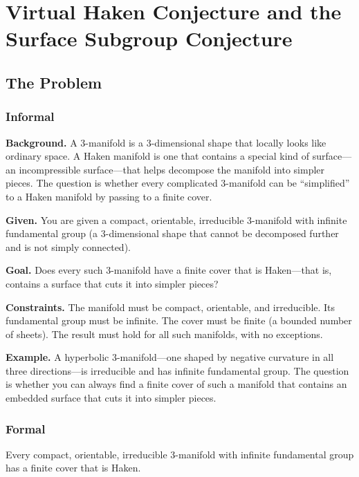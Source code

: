 \let\LocalMacro\relax

\chapter{Virtual Haken Conjecture and the Surface Subgroup Conjecture}

\section{The Problem}

\subsection{Informal}

\textbf{Background.} A 3-manifold is a 3-dimensional shape that locally looks like ordinary space. A Haken manifold is one that contains a special kind of surface---an incompressible surface---that helps decompose the manifold into simpler pieces. The question is whether every complicated 3-manifold can be ``simplified'' to a Haken manifold by passing to a finite cover.

\textbf{Given.} You are given a compact, orientable, irreducible 3-manifold with infinite fundamental group (a 3-dimensional shape that cannot be decomposed further and is not simply connected).

\textbf{Goal.} Does every such 3-manifold have a finite cover that is Haken---that is, contains a surface that cuts it into simpler pieces?

\textbf{Constraints.} The manifold must be compact, orientable, and irreducible. Its fundamental group must be infinite. The cover must be finite (a bounded number of sheets). The result must hold for all such manifolds, with no exceptions.

\textbf{Example.} A hyperbolic 3-manifold---one shaped by negative curvature in all three directions---is irreducible and has infinite fundamental group. The question is whether you can always find a finite cover of such a manifold that contains an embedded surface that cuts it into simpler pieces.

\subsection{Formal}
\begin{conjecture}
Every compact, orientable, irreducible 3-manifold with infinite fundamental group has a finite cover that is Haken.
\end{conjecture}

